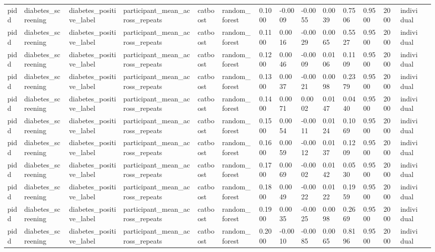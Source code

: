 \begin{tabular}{lllllllllllllll}
pidd & diabetes\_screening & diabetes\_positive\_label & participant\_mean\_across\_repeats & catboost & random\_forest & 0.1000 & -0.0009 & -0.0055 & 0.0039 & 0.7506 & 0.9500 & 2000 & individual &  \\
pidd & diabetes\_screening & diabetes\_positive\_label & participant\_mean\_across\_repeats & catboost & random\_forest & 0.1100 & 0.0016 & -0.0029 & 0.0065 & 0.5527 & 0.9500 & 2000 & individual &  \\
pidd & diabetes\_screening & diabetes\_positive\_label & participant\_mean\_across\_repeats & catboost & random\_forest & 0.1200 & 0.0046 & -0.0009 & 0.0106 & 0.1109 & 0.9500 & 2000 & individual &  \\
pidd & diabetes\_screening & diabetes\_positive\_label & participant\_mean\_across\_repeats & catboost & random\_forest & 0.1300 & 0.0037 & -0.0021 & 0.0098 & 0.2379 & 0.9500 & 2000 & individual &  \\
pidd & diabetes\_screening & diabetes\_positive\_label & participant\_mean\_across\_repeats & catboost & random\_forest & 0.1400 & 0.0071 & 0.0002 & 0.0147 & 0.0440 & 0.9500 & 2000 & individual &  \\
pidd & diabetes\_screening & diabetes\_positive\_label & participant\_mean\_across\_repeats & catboost & random\_forest & 0.1500 & 0.0054 & -0.0011 & 0.0124 & 0.1069 & 0.9500 & 2000 & individual &  \\
pidd & diabetes\_screening & diabetes\_positive\_label & participant\_mean\_across\_repeats & catboost & random\_forest & 0.1600 & 0.0059 & -0.0012 & 0.0137 & 0.1209 & 0.9500 & 2000 & individual &  \\
pidd & diabetes\_screening & diabetes\_positive\_label & participant\_mean\_across\_repeats & catboost & random\_forest & 0.1700 & 0.0069 & -0.0002 & 0.0142 & 0.0530 & 0.9500 & 2000 & individual &  \\
pidd & diabetes\_screening & diabetes\_positive\_label & participant\_mean\_across\_repeats & catboost & random\_forest & 0.1800 & 0.0049 & -0.0022 & 0.0122 & 0.1959 & 0.9500 & 2000 & individual &  \\
pidd & diabetes\_screening & diabetes\_positive\_label & participant\_mean\_across\_repeats & catboost & random\_forest & 0.1900 & 0.0035 & -0.0025 & 0.0098 & 0.2669 & 0.9500 & 2000 & individual &  \\
pidd & diabetes\_screening & diabetes\_positive\_label & participant\_mean\_across\_repeats & catboost & random\_forest & 0.2000 & -0.0010 & -0.0085 & 0.0065 & 0.8196 & 0.9500 & 2000 & individual &  \\

\end{tabular}
